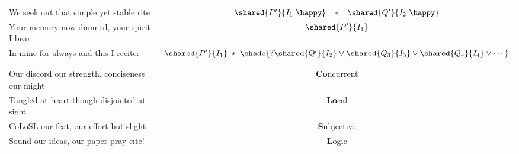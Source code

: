 \begin{tabular}{l @{} c}
We seek out that simple yet stable rite
&$\shared{P'}{I_1\ \happy}  \;\;\; * \;\;\;  \shared{Q'}{I_2\ \happy} $\vspace*{2pt}\\

Your memory now dimmed,  your spirit I bear
& $\shared{P'}{I_1}  $\\

In mine for always and this I recite:
&$\shared{P'}{I_1}  \;*\;  \shade{? \shared{Q'}{I_2}\lor \shared{Q_3}{I_3}\lor  \shared{Q_4}{I_4} \lor \cdots} $\\

%
\\\\



Our discord our strength, conciseness our might
&\textbf{Co}ncurrent\vspace*{4pt}\\

Tangled at heart though disjointed at sight
&\textbf{Lo}cal\hspace*{28pt}\vspace*{4pt}\\

CoLoSL our feat, our effort but slight
&\textbf{S}ubjective\hspace*{3pt}\vspace*{4pt}\\

Sound our ideas, our paper pray cite! & \textbf{L}ogic\hspace*{28pt}


\end{tabular}
%